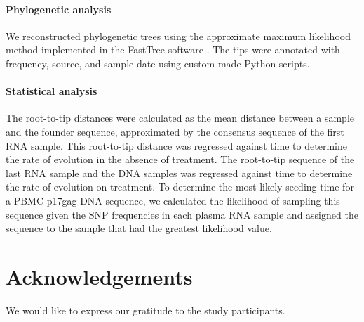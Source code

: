 \documentclass[aps,rmp,onecolumn,linenumbers]{revtex4-1}
\begin{document}
\paragraph*{Phylogenetic analysis}
We reconstructed phylogenetic trees using the approximate maximum likelihood method implemented in the FastTree software \cite{price_fasttree_2010}. The tips were annotated with frequency, source, and sample date using custom-made Python scripts.

\paragraph*{Statistical analysis}
The root-to-tip distances were calculated as the mean distance between a sample and the founder sequence, approximated by the consensus sequence of the first RNA sample. This root-to-tip distance was regressed against time to determine the rate of evolution in the absence of treatment. The root-to-tip sequence of the last RNA sample and the DNA samples was regressed against time to determine the rate of evolution on treatment. To determine the most likely seeding time for a PBMC p17gag DNA sequence, we calculated the likelihood of sampling this sequence given the SNP frequencies in each plasma RNA sample and assigned the sequence to the sample that had the greatest likelihood value.

\section*{Acknowledgements}
We would like to express our gratitude to the study participants.

\clearpage
\onecolumngrid
\end{document}
